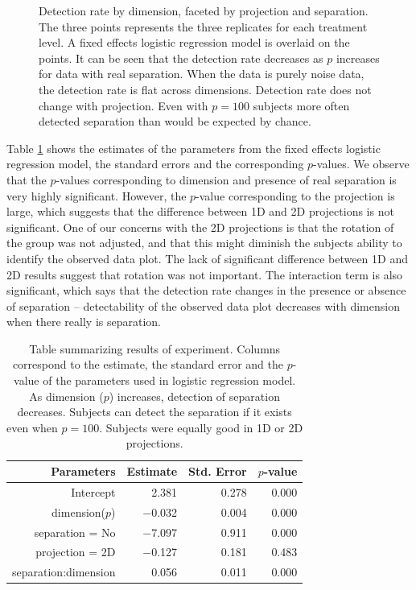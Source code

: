 \begin{figure}[ht]
   \centering
      \caption{Detection rate by dimension, faceted by projection and separation. The three points represents the three replicates for each treatment level. A fixed effects logistic regression model is overlaid on the points. It can be seen that the detection rate decreases as $p$ increases for data with real separation. When the data is purely noise data, the detection rate is flat across dimensions. Detection rate does not change with projection.  Even with $p = 100$ subjects more often detected separation than would be expected by chance. }
       \label{suc-rate-glm}
\end{figure}

Table \ref{params} shows the estimates of the parameters from the fixed effects logistic regression model, the standard errors and the corresponding $p$-values. We observe that the $p$-values corresponding to dimension and presence of real separation is very highly significant. However, the $p$-value corresponding to the projection is large, which suggests that the difference between 1D and 2D projections is not significant. One of our concerns with the 2D projections is that the rotation of the group was not adjusted, and that this might diminish the subjects ability to identify the observed data plot. The lack of significant difference between 1D and 2D results suggest that rotation was not important. The interaction term is also significant, which says that the detection rate changes in the presence or absence of separation -- detectability of the observed data plot decreases with dimension when there really is separation.

\begin{table}[ht]
\begin{center}
\caption{Table summarizing results of experiment. Columns correspond to the estimate, the standard error and the $p$-value of the parameters used in logistic regression model. As dimension ($p$) increases, detection of separation decreases. Subjects can detect the separation if it exists even when $p = 100$. Subjects were equally good in 1D or 2D projections.}
\vspace{0.15cm}
\begin{tabular}{r|rrr}
\hline
  \hline
 Parameters & Estimate & Std. Error  & $p$-value \\ 
  \hline
Intercept  & 2.381 & 0.278  & 0.000 \\ 
  dimension($p$) & $-$0.032 & 0.004  & 0.000 \\ 
  separation = No & $-$7.097 & 0.911  & 0.000 \\ 
  projection = 2D & $-$0.127 & 0.181  & 0.483 \\ 
  separation:dimension & 0.056 & 0.011 & 0.000\\
   \hline
\end{tabular}
\label{params}
\end{center}
\end{table}

